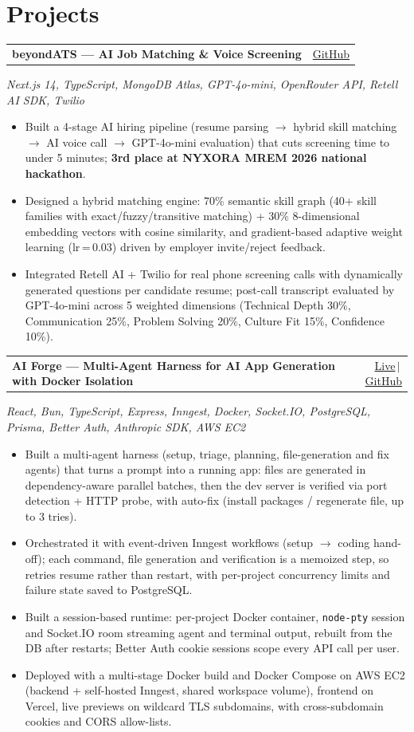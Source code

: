 \documentclass[10pt,a4paper]{article}
\makeatletter
\newcommand{\projhead}[2]{%
  \noindent
  \begin{tabular*}{\textwidth}{@{}l@{\extracolsep{\fill}}r@{}}
    \textbf{#1} & \small\color{linkblue}\href{#2}{GitHub}
  \end{tabular*}}
\newcommand{\projheadlive}[3]{%
  \noindent
  \begin{tabular*}{\textwidth}{@{}l@{\extracolsep{\fill}}r@{}}
    \textbf{#1} & \small\color{linkblue}\href{#3}{Live}\,$|$\,\href{#2}{GitHub}
  \end{tabular*}}
\newcommand{\techstack}[1]{%
  \noindent\textit{\small\color{black!70}#1}\par\vspace{0pt}}
\newenvironment{projitems}{%
  \begin{itemize}[leftmargin=1.1em, itemsep=0pt, topsep=0.5pt, parsep=0pt]
    \small
}{%
  \end{itemize}}
\makeatother
\begin{document}
\section{Projects}

\projhead{beyondATS --- AI Job Matching \& Voice Screening}{https://github.com/ASrivatsav27/beyondATS}
\techstack{Next.js 14, TypeScript, MongoDB Atlas, GPT-4o-mini, OpenRouter API, Retell AI SDK, Twilio}
\begin{projitems}
  \item Built a 4-stage AI hiring pipeline (resume parsing $\to$ hybrid skill matching $\to$ AI voice call $\to$ GPT-4o-mini evaluation) that cuts screening time to under 5 minutes; \textbf{3rd place at NYXORA MREM 2026 national hackathon}.
  \item Designed a hybrid matching engine: 70\% semantic skill graph (40+ skill families with exact/fuzzy/transitive matching) + 30\% 8-dimensional embedding vectors with cosine similarity, and gradient-based adaptive weight learning (lr\,=\,0.03) driven by employer invite/reject feedback.
  \item Integrated Retell AI + Twilio for real phone screening calls with dynamically generated questions per candidate resume; post-call transcript evaluated by GPT-4o-mini across 5 weighted dimensions (Technical Depth 30\%, Communication 25\%, Problem Solving 20\%, Culture Fit 15\%, Confidence 10\%).
\end{projitems}

\vspace{0pt}
\projheadlive{AI Forge --- Multi-Agent Harness for AI App Generation with Docker Isolation}{https://github.com/ASrivatsav27/AI-Forge}{https://app.adapasrivatsav.in}
\techstack{React, Bun, TypeScript, Express, Inngest, Docker, Socket.IO, PostgreSQL, Prisma, Better Auth, Anthropic SDK, AWS EC2}
\begin{projitems}
  \item Built a multi-agent harness (setup, triage, planning, file-generation and fix agents) that turns a prompt into a running app: files are generated in dependency-aware parallel batches, then the dev server is verified via port detection + HTTP probe, with auto-fix (install packages / regenerate file, up to 3 tries).
  \item Orchestrated it with event-driven Inngest workflows (setup $\to$ coding hand-off); each command, file generation and verification is a memoized step, so retries resume rather than restart, with per-project concurrency limits and failure state saved to PostgreSQL.
  \item Built a session-based runtime: per-project Docker container, \texttt{node-pty} session and Socket.IO room streaming agent and terminal output, rebuilt from the DB after restarts; Better Auth cookie sessions scope every API call per user.
  \item Deployed with a multi-stage Docker build and Docker Compose on AWS EC2 (backend + self-hosted Inngest, shared workspace volume), frontend on Vercel, live previews on wildcard TLS subdomains, with cross-subdomain cookies and CORS allow-lists.
\end{projitems}
\end{document}

